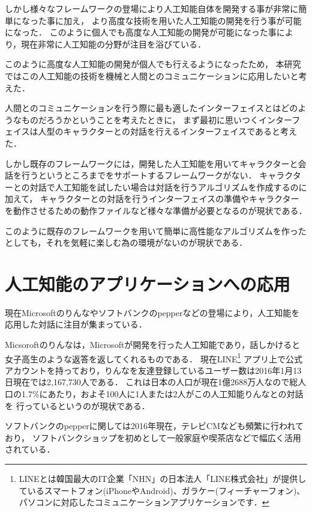 しかし様々なフレームワークの登場により人工知能自体を開発する事が非常に簡単になった事に加え，
より高度な技術を用いた人工知能の開発を行う事が可能になった．
このように個人でも高度な人工知能の開発が可能になった事により，現在非常に人工知能の分野が注目を浴びている．

このように高度な人工知能の開発が個人でも行えるようになったため，
本研究ではこの人工知能の技術を機械と人間とのコミュニケーションに応用したいと考えた．

人間とのコミュニケーションを行う際に最も適したインターフェイスとはどのようなものだろうかということを考えたときに，
まず最初に思いつくインターフェイスは人型のキャラクターとの対話を行えるインターフェイスであると考えた．

しかし既存のフレームワークには，開発した人工知能を用いてキャラクターと会話を行うというところまでをサポートするフレームワークがない．
キャラクターとの対話で人工知能を試したい場合は対話を行うアルゴリズムを作成するのに加えて，
キャラクターとの対話を行うインターフェイスの準備やキャラクターを動作させるための動作ファイルなど様々な準備が必要となるのが現状である．

このように既存のフレームワークを用いて簡単に高性能なアルゴリズムを作ったとしても，それを気軽に楽しむ為の環境がないのが現状である．

\newpage

\section{人工知能のアプリケーションへの応用}
現在Microsoftのりんな\cite{rinna}やソフトバンクのpepper\cite{pepper}などの登場により，人工知能を応用した対話に注目が集まっている．

Micsoroftのりんなは，Microsoftが開発を行った人工知能であり，話しかけると女子高生のような返答を返してくれるものである．
現在LINE\footnote{LINEとは韓国最大のIT企業「NHN」の日本法人「LINE株式会社」が提供しているスマートフォン(iPhoneやAndroid)、ガラケー(フィーチャーフォン)、パソコンに対応したコミュニケーションアプリケーションです．\cite{line}}
アプリ上で公式アカウントを持っており，りんなを友達登録しているユーザー数は2016年1月13日現在では2,167,730人である．
これは日本の人口が現在1億2688万人\cite{humen}なので総人口の1.7\%にあたり，およそ100人に1人または2人がこの人工知能りんなとの対話を
行っているというのが現状である．

ソフトバンクのpepperに関しては2016年現在，テレビCMなども頻繁に行われており，
ソフトバンクショップを初めとして一般家庭や喫茶店などで幅広く活用されている．

